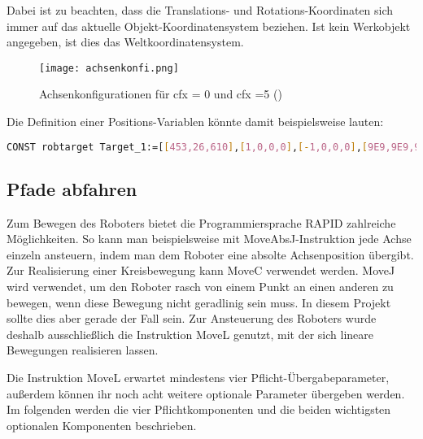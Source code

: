 Dabei ist zu beachten, dass die Translations- und Rotations-Koordinaten sich immer auf das aktuelle Objekt-Koordinatensystem beziehen. Ist kein Werkobjekt angegeben, ist dies das Weltkoordinatensystem. 

\begin{figure}[htbp]
\centering
\texttt{[image: achsenkonfi.png]}
\caption{Achsenkonfigurationen für cfx = 0 und cfx =5 (\cite{rapid2 S. 1160ff})} 
\label{achsenkonfi}
\end{figure}

Die Definition einer Positions-Variablen könnte damit beispielsweise lauten:

\begin{lstlisting}[caption=Beispiel für die Definition einer Position, label=robtarget, language=bash]
CONST robtarget Target_1:=[[453,26,610],[1,0,0,0],[-1,0,0,0],[9E9,9E9,9E9,9E9,9E9,9E9]];
\end{lstlisting} 

\subsection{Pfade abfahren}
\label{movesection}
Zum Bewegen des Roboters bietet die Programmiersprache RAPID zahlreiche Möglichkeiten. So kann man beispielsweise mit MoveAbsJ-Instruktion jede Achse einzeln ansteuern, indem man dem Roboter eine absolte Achsenposition übergibt. Zur Realisierung einer Kreisbewegung kann MoveC verwendet werden. MoveJ wird verwendet, um den Roboter rasch von einem Punkt an einen anderen zu bewegen, wenn diese Bewegung nicht geradlinig sein muss. In diesem Projekt sollte dies aber gerade der Fall sein. Zur Ansteuerung des Roboters wurde deshalb ausschließlich die Instruktion MoveL genutzt, mit der sich lineare Bewegungen realisieren lassen. 

Die Instruktion MoveL erwartet mindestens vier Pflicht-Übergabeparameter, außerdem können ihr noch acht weitere optionale Parameter übergeben werden. Im folgenden werden die vier Pflichtkomponenten und die beiden wichtigsten optionalen Komponenten beschrieben.

